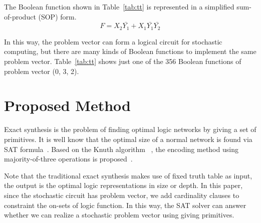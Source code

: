 \documentclass[conference,letterpaper]{IEEEtran}
\begin{document}
The Boolean function shown in Table~\ref{tab:tt} is represented in a simplified sum-of-product (SOP) form.
\begin{equation}
F=X_{2}\bar{Y_{1}}+X_{1} \bar{Y_{1}}\bar{Y_{2}}
\end{equation}

In this way, the problem vector can form a logical circuit for stochastic computing, but there are many kinds of Boolean functions to implement the same problem vector. Table~\ref{tab:tt} shows just one of the 356 Boolean functions of problem vector (0, 3, 2).


\section*{Proposed Method}
Exact synthesis is the problem of finding optimal logic networks by giving a set of primitives. 
It is well know that the optimal size of a normal network is found via SAT formula~\cite{3}. Based on the Knuth algorithm ~\cite{4}, the encoding method using majority-of-three operations is proposed~\cite{6}. 

Note that the traditional exact synthesis makes use of fixed truth table as input, the output is the optimal logic representations in size or depth.
In this paper, since the stochastic circuit has problem vector, we add cardinality clauses to constraint the on-sets of logic function. In this way, the SAT solver can answer whether we can realize a stochastic problem vector using giving primitives. 

\end{document}
